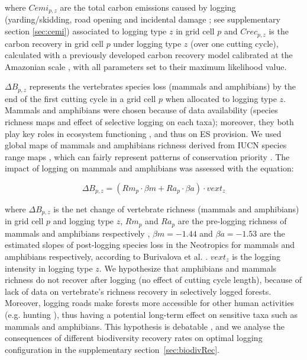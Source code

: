 \documentclass[12pt]{article}
\begin{document}
where $Cemi_{p,z}$ are the total carbon emissions caused by logging (yarding/skidding, road opening and incidental damage \cite{Piponiot2016}; see supplementary section \ref{sec:cemi}) associated to logging type $z$ in grid cell $p$  and $Crec_{p,z}$ is the carbon recovery in grid cell $p$ under logging type $z$ (over one cutting cycle), calculated with a previously developed carbon recovery model calibrated at the Amazonian scale \cite{Piponiot2016a}, with all parameters set to their maximum likelihood value. 

$\Delta B_{p,z}$ represents the vertebrates species loss (mammals and amphibians) by the end of the first cutting cycle in a grid cell $p$ when allocated to logging type $z$. Mammals and amphibians were chosen because of data availability (species richness maps and effect of selective logging on each taxa); moreover, they both play key roles in ecosystem functioning \cite{Wright2000,Muscarella2007,Fleming2009,Valencia-Aguilar2013}, and thus on ES provision. 
We used global maps of mammals and amphibians richness derived from IUCN species range maps \cite{Jenkins2013}, which can fairly represent patterns of conservation priority \cite{Marechaux2017}.
The impact of logging on mammals and amphibians was assessed with the equation: 

\begin{equation}
\label{eq:rloss}
\Delta B_{p,z} = \left(Rm_{p} \cdot \beta m + Ra_{p} \cdot \beta a  \right)  \cdot vext_z
\end{equation}

where $\Delta B_{p,z}$ is the net change of vertebrate richness (mammals and amphibians) in grid cell $p$ and logging type $z$, $Rm_{p}$ and $Ra_p$ are the pre-logging richness of mammals and amphibians respectively \cite{Jenkins2013}, $\beta m = - 1.44$ and $\beta a = - 1.53$  are the estimated slopes of post-logging species loss in the Neotropics for mammals and amphibians respectively, according to Burivalova et al. \cite{Burivalova2014}. $vext_z$ is the logging intensity in logging type $z$.
We hypothesize that amphibians and mammals richness do not recover after logging (no effect of cutting cycle length), because of lack of data on vertebrate's richness recovery in selectively logged forests. Moreover, logging roads make forests more accessible for other human activities (e.g. hunting \cite{Poulsen2009}), thus having a potential long-term effect on sensitive taxa such as mammals and amphibians. This hypothesis is debatable \cite{Clarke2005}, and we analyse the consequences of different biodiversity recovery rates on optimal logging configuration in the supplementary section~\ref{sec:biodivRec}. 
\end{document}
